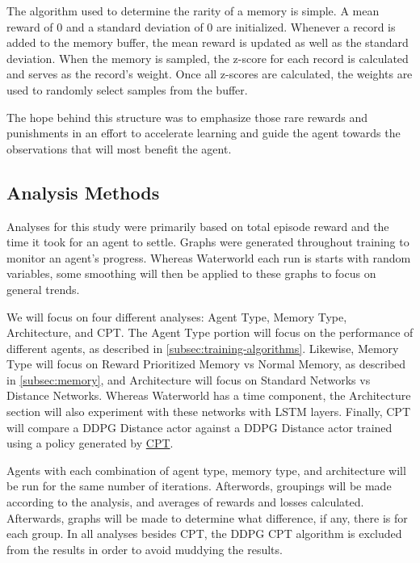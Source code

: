 The algorithm used to determine the rarity of a memory is simple.
A mean reward of 0 and a standard deviation of 0 are initialized.
Whenever a record is added to the memory buffer, the mean reward is updated as well as
the standard deviation.
When the memory is sampled, the z-score for each record is calculated and serves as
the record's weight.
Once all z-scores are calculated, the weights are used to randomly select samples
from the buffer.

The hope behind this structure was to emphasize those rare rewards and punishments in
an effort to accelerate learning and guide the agent towards the observations that
will most benefit the agent.

\subsection{Analysis Methods}\label{subsec:analysis-methods}
Analyses for this study were primarily based on total episode reward and the time it
took for an agent to settle.
Graphs were generated throughout training to monitor an agent's progress.
Whereas Waterworld each run is starts with random variables, some smoothing will then
be applied to these graphs to focus on general trends.

We will focus on four different analyses: Agent Type, Memory Type, Architecture, and
CPT\@.
The Agent Type portion will focus on the performance of different agents, as 
described in \autoref{subsec:training-algorithms}.
Likewise, Memory Type will focus on Reward Prioritized Memory vs Normal Memory, as 
described in \autoref{subsec:memory}, and Architecture will focus on Standard Networks
vs Distance Networks.
Whereas Waterworld has a time component, the Architecture section will also 
experiment with these networks with LSTM layers.
Finally, CPT will compare a DDPG Distance actor against a DDPG Distance actor trained
using a policy generated by \hyperref[subsubsec:cpt]{CPT}.

Agents with each combination of agent type, memory type, and architecture will be run
for the same number of iterations.
Afterwords, groupings will be made according to the analysis, and averages of rewards
and losses calculated.
Afterwards, graphs will be made to determine what difference, if any, there is for
each group.
In all analyses besides CPT, the DDPG CPT algorithm is excluded from the results in
order to avoid muddying the results.

